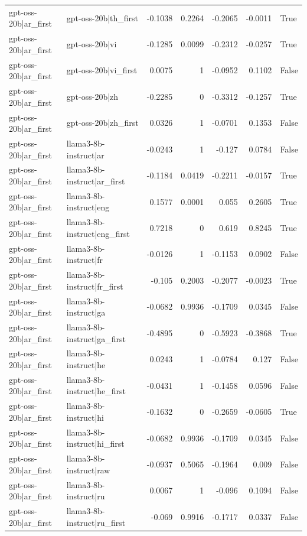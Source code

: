 \begin{table}
\begin{tabular}{l l r r r r l}
gpt-oss-20b|ar_first & gpt-oss-20b|th_first & -0.1038 & 0.2264 & -0.2065 & -0.0011 & True \\
gpt-oss-20b|ar_first & gpt-oss-20b|vi & -0.1285 & 0.0099 & -0.2312 & -0.0257 & True \\
gpt-oss-20b|ar_first & gpt-oss-20b|vi_first & 0.0075 & 1 & -0.0952 & 0.1102 & False \\
gpt-oss-20b|ar_first & gpt-oss-20b|zh & -0.2285 & 0 & -0.3312 & -0.1257 & True \\
gpt-oss-20b|ar_first & gpt-oss-20b|zh_first & 0.0326 & 1 & -0.0701 & 0.1353 & False \\
gpt-oss-20b|ar_first & llama3-8b-instruct|ar & -0.0243 & 1 & -0.127 & 0.0784 & False \\
gpt-oss-20b|ar_first & llama3-8b-instruct|ar_first & -0.1184 & 0.0419 & -0.2211 & -0.0157 & True \\
gpt-oss-20b|ar_first & llama3-8b-instruct|eng & 0.1577 & 0.0001 & 0.055 & 0.2605 & True \\
gpt-oss-20b|ar_first & llama3-8b-instruct|eng_first & 0.7218 & 0 & 0.619 & 0.8245 & True \\
gpt-oss-20b|ar_first & llama3-8b-instruct|fr & -0.0126 & 1 & -0.1153 & 0.0902 & False \\
gpt-oss-20b|ar_first & llama3-8b-instruct|fr_first & -0.105 & 0.2003 & -0.2077 & -0.0023 & True \\
gpt-oss-20b|ar_first & llama3-8b-instruct|ga & -0.0682 & 0.9936 & -0.1709 & 0.0345 & False \\
gpt-oss-20b|ar_first & llama3-8b-instruct|ga_first & -0.4895 & 0 & -0.5923 & -0.3868 & True \\
gpt-oss-20b|ar_first & llama3-8b-instruct|he & 0.0243 & 1 & -0.0784 & 0.127 & False \\
gpt-oss-20b|ar_first & llama3-8b-instruct|he_first & -0.0431 & 1 & -0.1458 & 0.0596 & False \\
gpt-oss-20b|ar_first & llama3-8b-instruct|hi & -0.1632 & 0 & -0.2659 & -0.0605 & True \\
gpt-oss-20b|ar_first & llama3-8b-instruct|hi_first & -0.0682 & 0.9936 & -0.1709 & 0.0345 & False \\
gpt-oss-20b|ar_first & llama3-8b-instruct|raw & -0.0937 & 0.5065 & -0.1964 & 0.009 & False \\
gpt-oss-20b|ar_first & llama3-8b-instruct|ru & 0.0067 & 1 & -0.096 & 0.1094 & False \\
gpt-oss-20b|ar_first & llama3-8b-instruct|ru_first & -0.069 & 0.9916 & -0.1717 & 0.0337 & False \\

\end{tabular}
\end{table}
